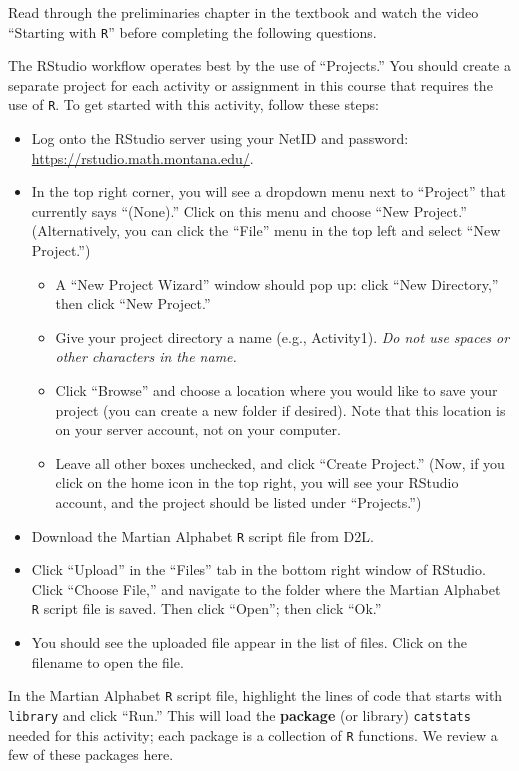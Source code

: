 \documentclass[
]{report}
\providecommand{\tightlist}{%
  \setlength{\itemsep}{0pt}\setlength{\parskip}{0pt}}
\begin{document}
Read through the preliminaries chapter in the textbook and watch the video ``Starting with \texttt{R}'' before completing the following questions.

The RStudio workflow operates best by the use of ``Projects.'' You should create a separate project for each activity or assignment in this course that requires the use of \texttt{R}. To get started with this activity, follow these steps:

\begin{itemize}
\tightlist
\item
  Log onto the RStudio server using your NetID and password: \url{https://rstudio.math.montana.edu/}.
\item
  In the top right corner, you will see a dropdown menu next to ``Project'' that currently says ``(None).'' Click on this menu and choose ``New Project.'' (Alternatively, you can click the ``File'' menu in the top left and select ``New Project.'')

  \begin{itemize}
  \tightlist
  \item
    A ``New Project Wizard'' window should pop up: click ``New Directory,'' then click ``New Project.''
  \item
    Give your project directory a name (e.g., Activity1). \emph{Do not use spaces or other characters in the name.}
  \item
    Click ``Browse'' and choose a location where you would like to save your project (you can create a new folder if desired). Note that this location is on your server account, not on your computer.
  \item
    Leave all other boxes unchecked, and click ``Create Project.'' (Now, if you click on the home icon in the top right, you will see your RStudio account, and the project should be listed under ``Projects.'')
  \end{itemize}
\item
  Download the Martian Alphabet \texttt{R} script file from D2L.
\item
  Click ``Upload'' in the ``Files'' tab in the bottom right window of RStudio. Click ``Choose File,'' and navigate to the folder where the Martian Alphabet \texttt{R} script file is saved. Then click ``Open''; then click ``Ok.''
\item
  You should see the uploaded file appear in the list of files. Click on the filename to open the file.
\end{itemize}

In the Martian Alphabet \texttt{R} script file, highlight the lines of code that starts with \texttt{library} and click ``Run.'' This will load the \textbf{package} (or library) \texttt{catstats} needed for this activity; each package is a collection of \texttt{R} functions. We review a few of these packages here.
\end{document}
